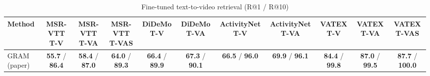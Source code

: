 \begin{table}[t]
\centering
\caption{Fine-tuned text-to-video retrieval (R@1 / R@10)}
\label{tab:finetune_t2v}
\small
\begin{tabular}{lcccccccccc}
\toprule
Method & MSR-VTT T-V & MSR-VTT T-VA & MSR-VTT T-VAS & DiDeMo T-V & DiDeMo T-VA & ActivityNet T-V & ActivityNet T-VA & VATEX T-V & VATEX T-VA & VATEX T-VAS \\
\midrule
GRAM (paper) & \textbf{55.7} / \textbf{86.4} & \textbf{58.4} / \textbf{87.0} & \textbf{64.0} / \textbf{89.3} & \textbf{66.4} / \textbf{89.9} & \textbf{67.3} / \textbf{90.1} & \textbf{66.5} / \textbf{96.0} & \textbf{69.9} / \textbf{96.1} & \textbf{84.4} / \textbf{99.8} & \textbf{87.0} / \textbf{99.5} & \textbf{87.7} / \textbf{100.0} \\
\bottomrule
\end{tabular}
\end{table}
